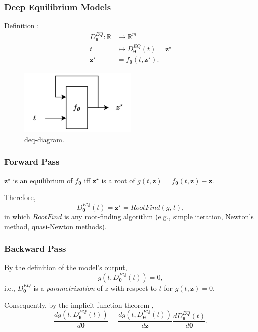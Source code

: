 \documentclass[t]{beamer}
\newcommand{\R}{\mathbb{R}}
\begin{document}
\begin{frame}
    \frametitle{Deep Equilibrium Models}
    Definition \cite{Bai2019}:
    \begin{align*}
	D^{EQ}_{\bm{\theta}}: \R &\longrightarrow \R^{m} \\
	t &\longmapsto 	D^{EQ}_{\bm{\theta}}(	t) = \bm{z}^{\star} \\
	\bm{z}^{\star} &= f_{\bm{\theta}}\left( t, \bm{z}^{\star} \right)
    .\end{align*}

    \pause
    \begin{figure}[h]
        \centering
        \includegraphics[width=0.5\textwidth]{deq-diagram.png}
        \caption{deq-diagram.}
        \label{fig:deq-diagram-}
    \end{figure}
\end{frame}

\begin{frame}
    \frametitle{Forward Pass}
    $\bm{z}^{\star}$ is an equilibrium of $f_{\bm{\theta}}$ iff $\bm{z}^{\star}$ is a root of $g(t,\bm{z}) = f_{\bm{\theta}}(t,\bm{z}) - \bm{z}$.
    \linebreak \pause

    Therefore, \[
    D^{EQ}_{\bm{\theta}}(t) = \bm{z}^{\star} = RootFind(g,t)
    ,\] in which $RootFind$ is any root-finding algorithm (e.g., simple iteration, Newton's method, quasi-Newton methods).
\end{frame}

\begin{frame}
    \frametitle{Backward Pass}
    By the definition of the model's output, \[
	g(t,D^{EQ}_{\bm{\theta}}(t)) = 0
    ,\] i.e., $D^{EQ}_{\bm{\theta}}$ is a \emph{parametrization} of $z$ with respect to $t$ for $g(t,\bm{z})=0$.
    \linebreak \pause

    Consequently, by the implicit function theorem \cite{Bai2019}, \[
	\frac{d g(t,D^{EQ}_{\bm{\theta}}(t))}{d \bm{\theta}} = \frac{d g(t,D^{EQ}_{\bm{\theta}}(t))}{d \bm{z}} \frac{d D^{EQ}_{\bm{\theta}}(t)}{d \bm{\theta}}
    .\] 
\end{frame}
\end{document}

